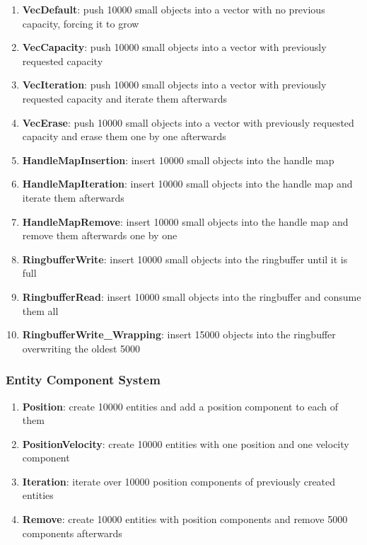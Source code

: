 \begin{enumerate}
	\item \textbf{VecDefault}: push 10000 small objects into a vector with no previous capacity, forcing it to grow
	
	\item \textbf{VecCapacity}: push 10000 small objects into a vector with previously requested capacity
	
	\item \textbf{VecIteration}: push 10000 small objects into a vector with previously requested capacity and iterate them afterwards 

	\item \textbf{VecErase}: push 10000 small objects into a vector with previously requested capacity and erase them one by one afterwards
	
	\item \textbf{HandleMapInsertion}: insert 10000 small objects into the handle map
	
	\item \textbf{HandleMapIteration}: insert 10000 small objects into the handle map and iterate them afterwards
	
	\item \textbf{HandleMapRemove}: insert 10000 small objects into the handle map and remove them afterwards one by one
	
	\item \textbf{RingbufferWrite}: insert 10000 small objects into the ringbuffer until it is full

	\item \textbf{RingbufferRead}: insert 10000 small objects into the ringbuffer and consume them all
	
	\item \textbf{RingbufferWrite\_Wrapping}: insert 15000 objects into the ringbuffer overwriting the oldest 5000	
\end{enumerate}

\subsubsection{Entity Component System}

\begin{enumerate}
	\item \textbf{Position}: create 10000 entities and add a position component to each of them
	
	\item \textbf{PositionVelocity}: create 10000 entities with one position and one velocity component
	
	\item \textbf{Iteration}: iterate over 10000 position components of previously created entities
	
	\item \textbf{Remove}: create 10000 entities with position components and remove 5000 components afterwards
\end{enumerate}

